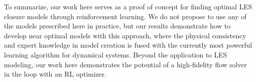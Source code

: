 To summarize, our work here serves as a proof of concept for finding optimal LES closure models through reinforcement learning.
We do not propose to use any of the models prescribed here in practice, but our results demonstrate how to develop near optimal models with this approach, where the physical consistency and expert knowledge in model creation is fused with the currently most powerful learning algorithm for dynamical systems.
Beyond the application to LES modeling, our work here demonstrates the potential of a high-fidelity flow solver in the loop with an RL optimizer.
